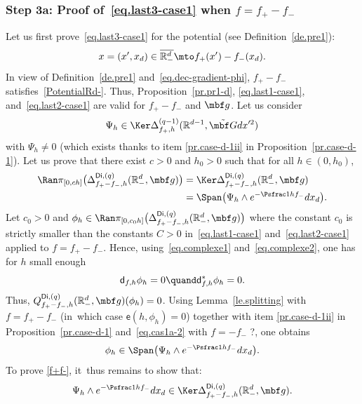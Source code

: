 \subsubsection*{Step 3a: Proof of~\eqref{eq.last3-case1} when $f=f_+-f_-$}
Let us first prove~\eqref{eq.last3-case1} for the potential (see Definition~\ref{de.pre1}):
\[
x=(x',x_d)\in \overline{\mathbb R^d_-}\mto f_+(x') -f_-(x_d).
\]
In view of Definition~\ref{de.pre1} and~\eqref{eq.dec-gradient-phi}, $f_+ -f_-$ satisfies~\ref{PotentialRd-}. Thus,
Proposition~\ref{pr.pr1-d}, \eqref{eq.last1-case1},
and~\eqref{eq.last2-case1} are valid for $f_+ -f_-$ and $ \mbf
g$. Let us consider
\[
\Psi_h \in \Ker \Delta_{f_+,h}^{(q-1)}(\mathbb
R^{d-1}, \tilde{\mbf G}dx'^2)
\]
with
$\Psi_h\neq 0$ (which exists thanks to item \eqref{pr.case-d-1ii} in Proposition~\ref{pr.case-d-1}).
Let us prove that there exist $c>0$ and $h_0>0$ such that for all
$h\in (0,h_0)$,
\begin{equation}\label{f+f-}
\begin{aligned}
\Ran \pi_{[0,ch]}\bigl(\Delta_{f_+ -f_-,h}^{\mathsf{Di},(q)}(\mathbb R_-^d, { \mbf g})\bigr)&=\Ker \Delta_{f_+
-f_-,h}^{\mathsf{Di},(q)}(\mathbb R_-^d, { \mbf g})\\
& =\Span \bigl(\Psi_h \wedge e^{-\Psfrac 1h f_- }dx_d\bigr).
\end{aligned}
\end{equation}
Let $c_0>0$ and $\phi_h\in \Ran \pi_{[0,c_0h]}\bigl(\Delta_{f_+-f_-,h}^{\mathsf{Di},(q)}(\mathbb R_-^d, \mbf g)
\bigr)$ where the constant $c_0$ is strictly smaller than the
constants $C>0$ in~\eqref{eq.last1-case1} and~\eqref{eq.last2-case1}
applied to $f=f_+ -f_-$. Hence, using~\eqref{eq.complexe1} and~\eqref{eq.complexe2}, one has for $h$ small enough
\[
\mathsf d_{f,h}\phi_h= 0 \quand \mathsf d_{f,h}^*\phi_h=0.
\]
Thus, $Q_{f_+-f_-,h}^{\mathsf{Di},(q)}(\mathbb R_-^d, \mbf g)(\phi_h)=0$. Using Lemma~\ref{le.splitting} with $f=f_+-f_-$ (in~which
case $\mathsf e(h,\phi_h)=0$) together with item \eqref{pr.case-d-1ii} in
Proposition~\ref{pr.case-d-1} and~\eqref{eq.cas1a-2} with $f=-f_-$ ?, one obtains
\begin{equation}\label{eq.imply-Phi}
\phi_h\in \Span \bigl(\Psi_h \wedge e^{-\Psfrac 1h f_- }dx_d\bigr).
\end{equation}
To prove \eqref{f+f-}, it~thus remains to show that:
\begin{equation}\label{=psi-1}
\Psi_h \wedge e^{-\Psfrac 1h f_- }dx_d\in \Ker \Delta_{f_+ -f_-,h}^{\mathsf{Di},(q)}(\mathbb R_-^d, { \mbf g}).
\end{equation}
